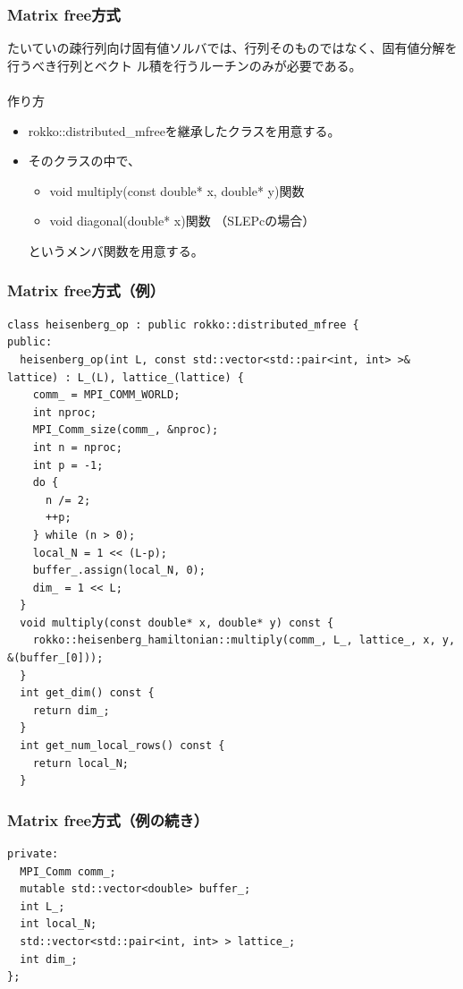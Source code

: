 \begin{frame}[c,fragile]
  \frametitle{Matrix free方式}
たいていの疎行列向け固有値ソルバでは、行列そのものではなく、固有値分解を行うべき行列とベクト
ル積を行うルーチンのみが必要である。
　\\
　\\
\noindent
作り方
  \begin{itemize}
  \item rokko::distributed\_mfreeを継承したクラスを用意する。
  \item そのクラスの中で、
     \begin{itemize}
     \item void multiply(const double* x, double* y)関数
     \item void diagonal(double* x)関数 （SLEPcの場合） 
     \end{itemize}
というメンバ関数を用意する。
  \end{itemize}
\end{frame}

\begin{frame}[c,fragile]
  \frametitle{Matrix free方式（例）}
\begin{lstlisting}
class heisenberg_op : public rokko::distributed_mfree {
public:
  heisenberg_op(int L, const std::vector<std::pair<int, int> >& lattice) : L_(L), lattice_(lattice) {
    comm_ = MPI_COMM_WORLD;
    int nproc;
    MPI_Comm_size(comm_, &nproc);
    int n = nproc;
    int p = -1;
    do {
      n /= 2;
      ++p;
    } while (n > 0);
    local_N = 1 << (L-p);
    buffer_.assign(local_N, 0);
    dim_ = 1 << L;
  }
  void multiply(const double* x, double* y) const {
    rokko::heisenberg_hamiltonian::multiply(comm_, L_, lattice_, x, y, &(buffer_[0]));
  }
  int get_dim() const {
    return dim_;
  }
  int get_num_local_rows() const {
    return local_N;
  }
\end{lstlisting}
\end{frame}

\begin{frame}[c,fragile]
  \frametitle{Matrix free方式（例の続き）}
\begin{lstlisting}
private:
  MPI_Comm comm_;
  mutable std::vector<double> buffer_;
  int L_;
  int local_N;
  std::vector<std::pair<int, int> > lattice_;
  int dim_;
};
\end{lstlisting}
\end{frame}


